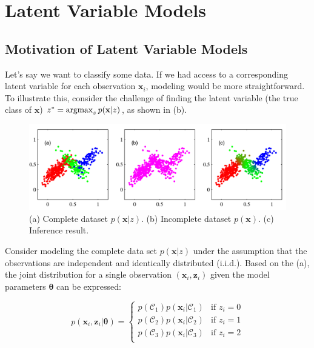 \chapter{Latent Variable Models}
\section{Motivation of Latent Variable Models}
\label{sec:intro_motivation}

Let's say we want to classify some data. If we had access to a corresponding latent variable for each observation \( \mathbf{x}_i \), modeling would be more straightforward. To illustrate this, consider the challenge of finding the latent variable (\ie the true class of \( \mathbf{x} \)) \( z^* = \operatorname*{\operatorname{argmax}}_{z} p(\mathbf{x} | z) \), as shown in (b).

\begin{figure}[h]
	\begin{center}			
		\includegraphics[scale=0.25]{./images/generative/latent.png}
	\end{center}
	\caption{(a) Complete dataset \( p(\mathbf{x} | z) \). (b) Incomplete dataset \( p(\mathbf{x}) \). (c) Inference result.}
	\label{fig:clusters}
\end{figure}

Consider modeling the complete data set \( p(\mathbf{x} | z) \) under the assumption that the observations are independent and identically distributed (i.i.d.). Based on the (a), the joint distribution for a single observation \( (\mathbf{x}_i, \mathbf{z}_i) \) given the model parameters \( \boldsymbol{\theta} \) can be expressed:

\[
p(\mathbf{x}_i, \mathbf{z}_i | \boldsymbol{\theta}) = 
\begin{cases}
p(\mathcal{C}_1) p(\mathbf{x}_i | \mathcal{C}_1) & \text{if } z_i = 0 \\
p(\mathcal{C}_2) p(\mathbf{x}_i | \mathcal{C}_2) & \text{if } z_i = 1 \\
p(\mathcal{C}_3) p(\mathbf{x}_i | \mathcal{C}_3) & \text{if } z_i = 2 \\
\end{cases}
\]



